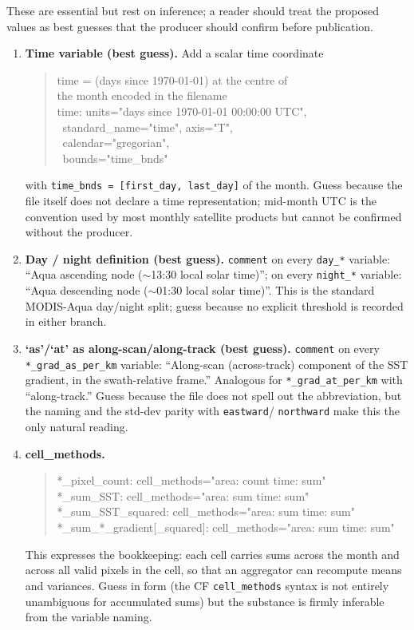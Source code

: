 \documentclass[11pt]{article}
\begin{document}
These are essential but rest on inference; a reader should treat
the proposed values as best guesses that the producer should
confirm before publication.

\begin{enumerate}
  \item \textbf{Time variable (best guess).} Add a scalar time
    coordinate
    \begin{quote}\ttfamily
      time = (days since 1970-01-01) at the centre of \\
      \phantom{time = }the month encoded in the filename \\
      time: units="days since 1970-01-01 00:00:00 UTC", \\
      \phantom{time:}\ standard\_name="time", axis="T", \\
      \phantom{time:}\ calendar="gregorian", \\
      \phantom{time:}\ bounds="time\_bnds"
    \end{quote}
    with \texttt{time\_bnds = [first\_day, last\_day]} of the
    month. Guess because the file itself does not declare a time
    representation; mid-month UTC is the convention used by most
    monthly satellite products but cannot be confirmed without the
    producer.

  \item \textbf{Day / night definition (best guess).}
    \texttt{comment} on every \texttt{day\_*} variable:
    ``Aqua ascending node ($\sim$13:30 local solar time)''; on
    every \texttt{night\_*} variable:
    ``Aqua descending node ($\sim$01:30 local solar time)''. This
    is the standard MODIS-Aqua day/night split; guess because no
    explicit threshold is recorded in either branch.

  \item \textbf{`as'/`at' as along-scan/along-track (best
    guess).} \texttt{comment} on every
    \texttt{*\_grad\_as\_per\_km} variable:
    ``Along-scan (across-track) component of the SST gradient,
    in the swath-relative frame.'' Analogous for
    \texttt{*\_grad\_at\_per\_km} with ``along-track.'' Guess
    because the file does not spell out the abbreviation, but
    the naming and the std-dev parity with \texttt{eastward}/
    \texttt{northward} make this the only natural reading.

  \item \textbf{cell\_methods.}
    \begin{quote}\ttfamily
      *\_pixel\_count: cell\_methods="area: count time: sum" \\
      *\_sum\_SST:    cell\_methods="area: sum time: sum" \\
      *\_sum\_SST\_squared: cell\_methods="area: sum time: sum" \\
      *\_sum\_*\_gradient[\_squared]: cell\_methods="area: sum time: sum"
    \end{quote}
    This expresses the bookkeeping: each cell carries
    sums across the month and across all valid pixels in the
    cell, so that an aggregator can recompute means and
    variances. Guess in form (the CF \texttt{cell\_methods}
    syntax is not entirely unambiguous for accumulated sums)
    but the substance is firmly inferable from the variable
    naming.


\end{enumerate}
\end{document}
